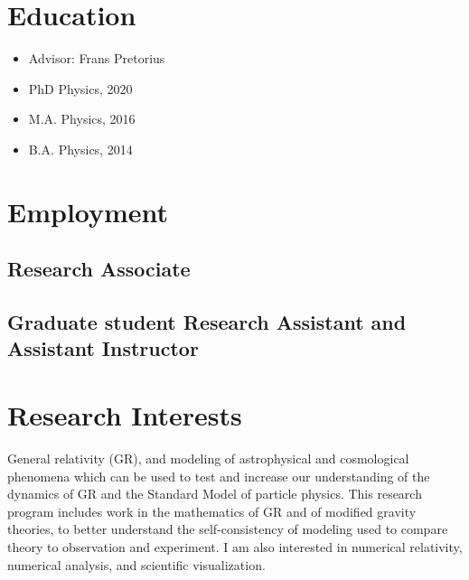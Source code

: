 \documentclass{my_cv}
\begin{document}
\bigskip
{}
\section{Education}
\begin{itemize}
\item Advisor: Frans Pretorius
\item PhD  Physics, 2020 
\item M.A. Physics, 2016
\end{itemize}
\begin{itemize}
\item B.A. Physics, 2014
\end{itemize}
\section{Employment}
\subsection{Research Associate}
\begin{itemize}
\end{itemize}
\subsection{Graduate student Research Assistant and Assistant Instructor}
\begin{itemize}
\end{itemize}
\section{Research Interests}
	General relativity (GR), and modeling of
astrophysical and cosmological phenomena which can be used
to test and increase our understanding of the dynamics of GR and the 
Standard Model of particle physics.
This research program includes work in
the mathematics of GR and of modified gravity theories, to better understand
the self-consistency of modeling used to compare theory to observation and
experiment.
I am also interested in numerical relativity, numerical analysis, and
scientific visualization.
\end{document}
